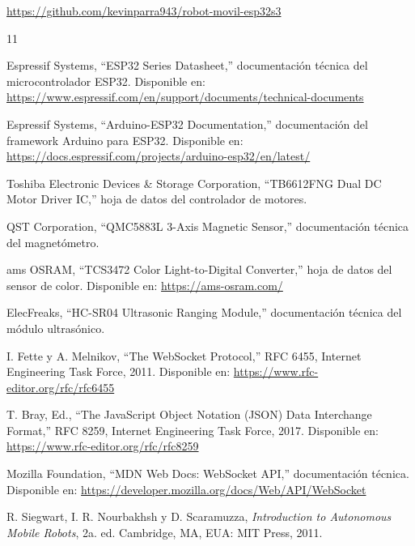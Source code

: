 \documentclass[journal]{IEEEtran}
\begin{document}
\begin{center}
\url{https://github.com/kevinparra943/robot-movil-esp32s3}
\end{center}

\ifCLASSOPTIONcaptionsoff
  \newpage
\fi

\begin{thebibliography}{11}

Espressif Systems, ``ESP32 Series Datasheet,'' documentación técnica del microcontrolador ESP32. Disponible en: \url{https://www.espressif.com/en/support/documents/technical-documents}

Espressif Systems, ``Arduino-ESP32 Documentation,'' documentación del framework Arduino para ESP32. Disponible en: \url{https://docs.espressif.com/projects/arduino-esp32/en/latest/}

Toshiba Electronic Devices \& Storage Corporation, ``TB6612FNG Dual DC Motor Driver IC,'' hoja de datos del controlador de motores.

QST Corporation, ``QMC5883L 3-Axis Magnetic Sensor,'' documentación técnica del magnetómetro.

ams OSRAM, ``TCS3472 Color Light-to-Digital Converter,'' hoja de datos del sensor de color. Disponible en: \url{https://ams-osram.com/}

ElecFreaks, ``HC-SR04 Ultrasonic Ranging Module,'' documentación técnica del módulo ultrasónico.

I. Fette y A. Melnikov, ``The WebSocket Protocol,'' RFC 6455, Internet Engineering Task Force, 2011. Disponible en: \url{https://www.rfc-editor.org/rfc/rfc6455}

T. Bray, Ed., ``The JavaScript Object Notation (JSON) Data Interchange Format,'' RFC 8259, Internet Engineering Task Force, 2017. Disponible en: \url{https://www.rfc-editor.org/rfc/rfc8259}

Mozilla Foundation, ``MDN Web Docs: WebSocket API,'' documentación técnica. Disponible en: \url{https://developer.mozilla.org/docs/Web/API/WebSocket}

R. Siegwart, I. R. Nourbakhsh y D. Scaramuzza, \emph{Introduction to Autonomous Mobile Robots}, 2a. ed. Cambridge, MA, EUA: MIT Press, 2011.

\end{thebibliography}
\end{document}
